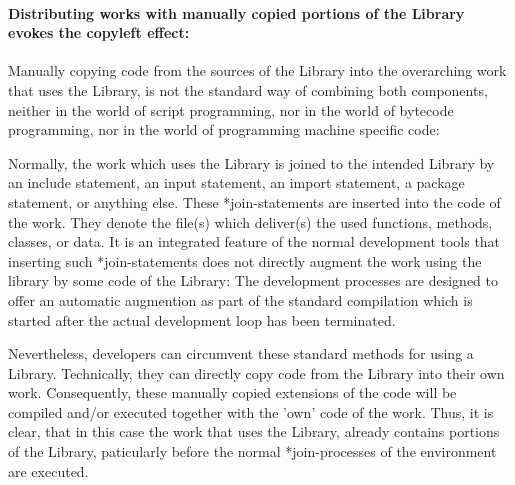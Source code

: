 \paragraph{Distributing works with manually copied portions of the Library
evokes the copyleft effect:}
\label{RevEngCopyCodeManually}
Manually copying code from the sources of the Library into the overarching
work that uses the Library, is not the standard way of combining both
components, neither in the world of script programming, nor in the world of
bytecode programming, nor in the world of programming machine specific code:

Normally, the work which uses the Library is joined to the intended Library by
an include statement, an input statement, an import statement, a package
statement, or anything else. These *join-statements are inserted into the code
of the work. They denote the file(s) which deliver(s) the used functions,
methods, classes, or data. It is an integrated feature of the normal development
tools that inserting such *join-statements does not directly augment the work
using the library by some code of the Library: The development processes are
designed to offer an automatic augmention as part of the standard compilation
which is started after the actual development loop has been terminated.

Nevertheless, developers can circumvent these standard methods for using a
Library. Technically, they can directly copy code from the Library into their
own work. Consequently, these manually copied extensions of the code will be
compiled and/or executed together with the 'own' code of the work. Thus, it is
clear, that in this case the work that uses the Library, already contains
portions of the Library, paticularly before the normal *join-processes of the
environment are executed.


